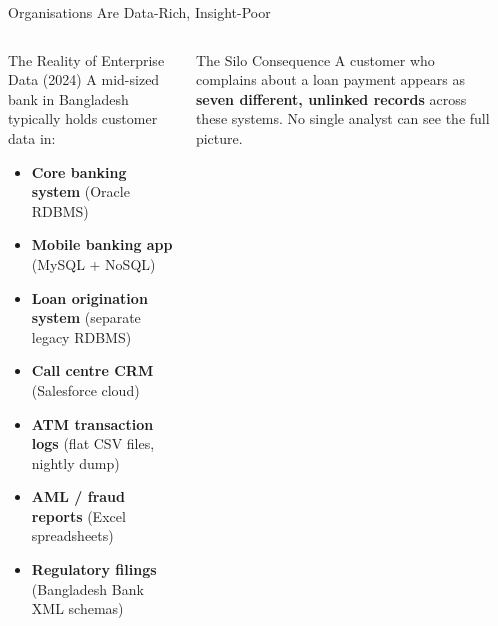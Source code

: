 \documentclass[aspectratio=169,10pt]{beamer}
\begin{document}
\begin{frame}{Organisations Are Data-Rich, Insight-Poor}
  \begin{columns}[T]
      \begin{block}{The Reality of Enterprise Data (2024)}
        A mid-sized bank in Bangladesh typically holds customer data in:
        \begin{itemize}
          \item \textbf{Core banking system} (Oracle RDBMS)
          \item \textbf{Mobile banking app} (MySQL + NoSQL)
          \item \textbf{Loan origination system} (separate legacy RDBMS)
          \item \textbf{Call centre CRM} (Salesforce cloud)
          \item \textbf{ATM transaction logs} (flat CSV files, nightly dump)
          \item \textbf{AML / fraud reports} (Excel spreadsheets)
          \item \textbf{Regulatory filings} (Bangladesh Bank XML schemas)
        \end{itemize}
      \end{block}
      \vspace{4pt}
      \begin{alertblock}{The Silo Consequence}
        A customer who complains about a loan payment appears as \textbf{seven different, unlinked records} across these systems.  No single analyst can see the full picture.
      \end{alertblock}

      \begin{center}
\end{center}
\end{columns}
\end{frame}
\end{document}
